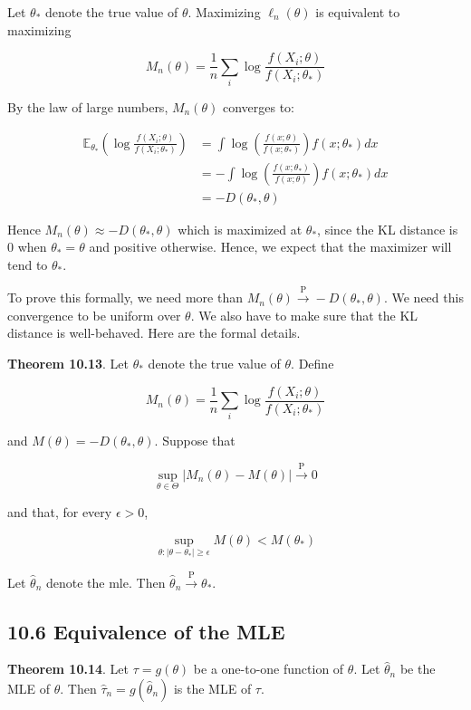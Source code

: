 Let \(\theta_*\) denote the true value of \(\theta\). Maximizing
\(\ell_{n}(\theta)\) is equivalent to maximizing

\[M_{n}(\theta) = \frac{1}{n} \sum_{i} \log \frac{f(X_{i}; \theta)}{f(X_{i}; \theta_*)}\]

By the law of large numbers, \(M_{n}(\theta)\) converges to:

\begin{align*}
\mathbb{E}_{\theta_*} \left( \log \frac{f(X_{i}; \theta)}{f(X_{i}; \theta_*)} \right)
& = \int \log \left( \frac{f(x; \theta)}{f(x; \theta_*)} \right) f(x; \theta_*) dx \\
& = - \int \log \left( \frac{f(x; \theta_*)}{f(x; \theta)} \right) f(x; \theta_*) dx \\
&= -D(\theta_*, \theta)
\end{align*}

Hence \(M_{n}(\theta) \approx -D(\theta_*, \theta)\) which is maximized at
\(\theta_*\), since the KL distance is 0 when \(\theta_* = \theta\) and
positive otherwise. Hence, we expect that the maximizer will tend to
\(\theta_*\).

To prove this formally, we need more than
\(M_{n}(\theta) \xrightarrow{\text{P}} -D(\theta_*, \theta)\). We need
this convergence to be uniform over \(\theta\). We also have to make
sure that the KL distance is well-behaved. Here are the formal details.

\textbf{Theorem 10.13}. Let \(\theta_*\) denote the true value of
\(\theta\). Define

\[M_{n}(\theta) = \frac{1}{n} \sum_{i} \log \frac{f(X_{i}; \theta)}{f(X_{i}; \theta_*)}\]

and \(M(\theta) = -D(\theta_*, \theta)\). Suppose that

\[ \sup _{\theta \in \Theta} |M_{n}(\theta) - M(\theta)| \xrightarrow{\text{P}} 0 \]

and that, for every \(\epsilon > 0\),

\[ \sup _{\theta : |\theta - \theta_*| \geq \epsilon} M(\theta) < M(\theta_*)\]

Let \(\hat{\theta}_{n}\) denote the mle. Then
\(\hat{\theta}_{n} \xrightarrow{\text{P}} \theta_*\).

\subsection*{10.6 Equivalence of the
MLE}\label{equivalence-of-the-mle}

\textbf{Theorem 10.14}. Let \(\tau = g(\theta)\) be a one-to-one
function of \(\theta\). Let \(\hat{\theta}_{n}\) be the MLE of \(\theta\).
Then \(\hat{\tau}_{n} = g(\hat{\theta}_{n})\) is the MLE of \(\tau\).

